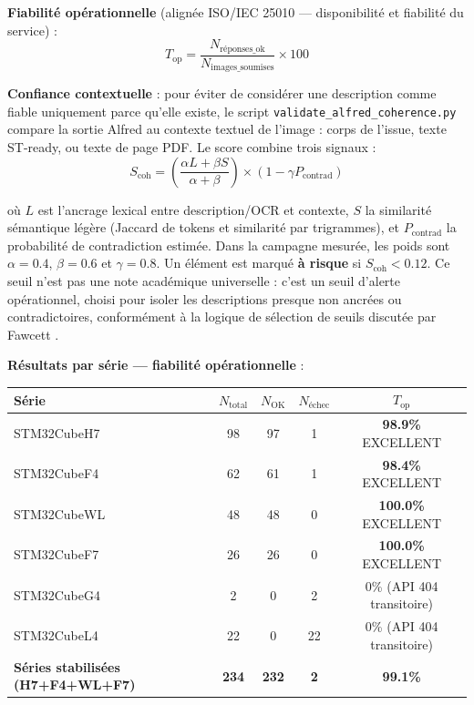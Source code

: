 \documentclass[12pt,a4paper]{report}
\begin{document}
\textbf{Fiabilité opérationnelle} (alignée ISO/IEC 25010 --- disponibilité et fiabilité du service) :
\begin{equation}
T_{\text{op}} = \frac{N_{\text{réponses\_ok}}}{N_{\text{images\_soumises}}} \times 100
\label{eq:alfred_conf}
\end{equation}

\textbf{Confiance contextuelle} : pour éviter de considérer une description comme fiable uniquement parce qu'elle existe, le script \texttt{validate\_alfred\_coherence.py} compare la sortie Alfred au contexte textuel de l'image : corps de l'issue, texte ST-ready, ou texte de page PDF. Le score combine trois signaux :
\begin{equation}
S_{\text{coh}} =
\left(\frac{\alpha L + \beta S}{\alpha + \beta}\right)
\times (1 - \gamma P_{\text{contrad}})
\label{eq:alfred_coherence_score}
\end{equation}

où $L$ est l'ancrage lexical entre description/OCR et contexte, $S$ la similarité sémantique légère (Jaccard de tokens et similarité par trigrammes), et $P_{\text{contrad}}$ la probabilité de contradiction estimée. Dans la campagne mesurée, les poids sont $\alpha=0.4$, $\beta=0.6$ et $\gamma=0.8$. Un élément est marqué \textbf{à risque} si $S_{\text{coh}} < 0.12$. Ce seuil n'est pas une note académique universelle : c'est un seuil d'alerte opérationnel, choisi pour isoler les descriptions presque non ancrées ou contradictoires, conformément à la logique de sélection de seuils discutée par Fawcett \cite{fawcett2006roc}.

\textbf{Résultats par série --- fiabilité opérationnelle} :

\begin{longtable}{lcccc}
\toprule
\textbf{Série} & $N_{\text{total}}$ & $N_{\text{OK}}$ & $N_{\text{échec}}$ & $T_{\text{op}}$ \\
\midrule
STM32CubeH7 & 98 & 97 & 1 & \textbf{98.9\%} \textcolor{green!60!black}{EXCELLENT} \\
STM32CubeF4 & 62 & 61 & 1 & \textbf{98.4\%} \textcolor{green!60!black}{EXCELLENT} \\
STM32CubeWL & 48 & 48 & 0 & \textbf{100.0\%} \textcolor{green!60!black}{EXCELLENT} \\
STM32CubeF7 & 26 & 26 & 0 & \textbf{100.0\%} \textcolor{green!60!black}{EXCELLENT} \\
STM32CubeG4 & 2 & 0 & 2 & 0\% (API 404 transitoire) \\
STM32CubeL4 & 22 & 0 & 22 & 0\% (API 404 transitoire) \\
\midrule
\textbf{Séries stabilisées (H7+F4+WL+F7)} & \textbf{234} & \textbf{232} & \textbf{2} & \textbf{99.1\%} \\
\bottomrule
\end{longtable}
\end{document}
